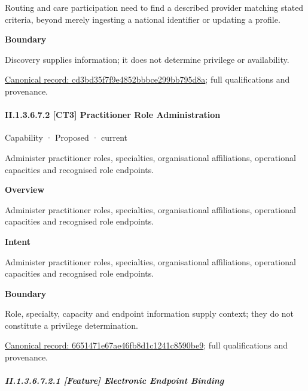Routing and care participation need to find a described provider matching stated criteria, beyond merely ingesting a national identifier or updating a profile.



\textbf{Boundary}



Discovery supplies information; it does not determine privilege or availability.


{\footnotesize \href{../../../../continuum/strategy/capability/feature/cd3bd35f7f9e4852bbbce299bb795d8a.md}{Canonical record: cd3bd35f7f9e4852bbbce299bb795d8a}; full qualifications and provenance.}\par
\paragraph*{II.1.3.6.7.2 [CT3] Practitioner Role Administration}
\label{navigation:II.1.3.6.7.2}

\label{element:6651471e67ae46fb8d1c1241c8590be9}
{\small Capability · Proposed · current}\par

Administer practitioner roles, specialties, organisational affiliations, operational capacities and recognised role endpoints.



\textbf{Overview}



Administer practitioner roles, specialties, organisational affiliations, operational capacities and recognised role endpoints.



\textbf{Intent}



Administer practitioner roles, specialties, organisational affiliations, operational capacities and recognised role endpoints.



\textbf{Boundary}



Role, specialty, capacity and endpoint information supply context; they do not constitute a privilege determination.


{\footnotesize \href{../../../../continuum/strategy/capability/6651471e67ae46fb8d1c1241c8590be9.md}{Canonical record: 6651471e67ae46fb8d1c1241c8590be9}; full qualifications and provenance.}\par
\subparagraph*{II.1.3.6.7.2.1 [Feature] Electronic Endpoint Binding}
\label{navigation:II.1.3.6.7.2.1}

